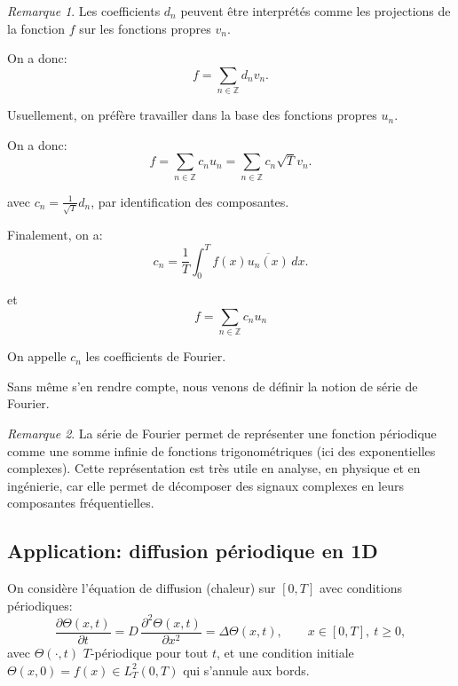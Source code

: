 \documentclass[11pt,a4paper]{article}
\numberwithin{equation}{section}
\theoremstyle{plain}
\theoremstyle{definition}
\theoremstyle{remark}
\newtheorem*{remark}{Remarque}
\newcommand{\Z}{\mathbb{Z}}
\newcommand{\Lap}{\Delta}
\begin{document}
\begin{remark}
    Les coefficients $d_n$ peuvent être interprétés comme les projections de la fonction $f$ sur les fonctions propres $v_n$.
\end{remark}

On a donc:
\[
    f = \sum_{n \in \Z} d_n v_n.
\]

Usuellement, on préfère travailler dans la base des fonctions propres $u_n$.

On a donc:
\[
    f = \sum_{n \in \Z} c_n u_n = \sum_{n \in \Z} c_n\sqrt{T} v_n.
\]

avec $c_n = \frac{1}{\sqrt{T}} d_n$, par identification des composantes.

Finalement, on a:
\[
    c_n = \frac{1}{T} \int_0^T f(x) \overline{u_n(x)}\,dx.
\]

et 
\begin{equation} \label{eq:fourier}
    f = \sum_{n \in \Z} c_n u_n    
\end{equation}


On appelle $c_n$ les coefficients de Fourier.

Sans même s'en rendre compte, nous venons de définir la notion de série de Fourier.
\begin{remark}
    La série de Fourier permet de représenter une fonction périodique comme une somme infinie de fonctions trigonométriques (ici des exponentielles complexes).
    Cette représentation est très utile en analyse, en physique et en ingénierie, car elle permet de décomposer des signaux complexes en leurs composantes fréquentielles.
\end{remark}


\subsection{Application: diffusion périodique en 1D}

On considère l'équation de diffusion (chaleur) sur $[0,T]$ avec conditions périodiques:
\[
    \frac{\partial \Theta(x,t)}{\partial t} = D \, \frac{\partial^2 \Theta(x,t)}{\partial x^2} = \Lap \Theta(x,t), \qquad x \in [0,T],\ t\ge 0,
\]
avec $\Theta(\cdot,t)$ $T$-périodique pour tout $t$, et une condition initiale $\Theta(x,0)=f(x)\in L^2_T(0,T)$ qui s'annule aux bords.
\end{document}
